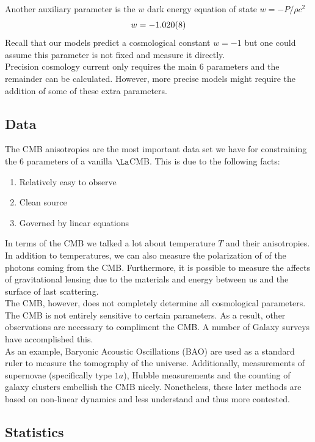 \documentclass{article}
\begin{document}
Another auxiliary parameter is the $w$ dark energy equation of state $w = - P / \rho c^2$
\[ w = - \SI{1.02\pm0.008}{} \]
Recall that our models predict a cosmological constant $w = -1$ but one could assume this parameter is not fixed and measure it directly. \\

Precision cosmology current only requires the main $6$ parameters and the remainder can be calculated. However, more precise models might require the addition of some of these extra parameters.

\subsection{Data}

The CMB anisotropies are the most important data set we have for constraining the $6$ parameters of a vanilla $\La$CMB. This is due to the following facts:
\begin{enumerate}
    \item Relatively easy to observe
    \item Clean source
    \item Governed by linear equations
\end{enumerate}
In terms of the CMB we talked a lot about temperature $T$ and their anisotropies. In addition to temperatures, we can also measure the polarization of of the photons coming from the CMB. Furthermore, it is possible to measure the affects of gravitational lensing due to the materials and energy between us and the surface of last scattering.\\

The CMB, however, does not completely determine all cosmological parameters. The CMB is not entirely sensitive to certain parameters. As a result, other observations are necessary to compliment the CMB. A number of Galaxy surveys have accomplished this. \\

As an example, Baryonic Acoustic Oscillations (BAO) are used as a standard ruler to measure the tomography of the universe. Additionally, measurements of supernovae (specifically type $1a$), Hubble measurements and the counting of galaxy clusters embellish the CMB nicely. Nonetheless, these later methods are based on non-linear dynamics and less understand and thus more contested.

\subsection{Statistics}
\end{document}
